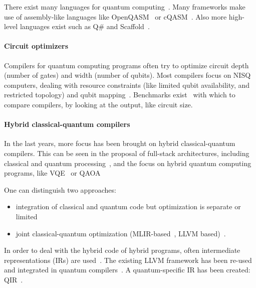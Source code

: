 There exist many languages for quantum computing~\cite{chong_programming_2017, heim_quantum_2020}.
Many frameworks make use of assembly-like languages like OpenQASM~\cite{cross_open_2017} or cQASM~\cite{khammassi_cqasm_2018}.
Also more high-level languages exist such as Q\# and Scaffold~\cite{svore_q_2018, litteken_updated_2020, heim_quantum_2020}.

\paragraph{Circuit optimizers}
Compilers for quantum computing programs often try to optimize circuit depth (number of gates) and width (number of qubits).
Most compilers focus on \ac{NISQ} computers, dealing with resource constraints (like limited qubit availability, and restricted topology) \cite{chong_programming_2017, murali_full-stack_2019, bandic_full-stack_2022} and qubit mapping~\cite{li_tackling_2019, zhang_context-sensitive_2020, bandic_mapping_2023, nishio_extracting_2020}.
Benchmarks exist~\cite{li_qasmbench_2023, tomesh_supermarq_2022} with which to compare compilers, by looking at the output, like circuit size.

\paragraph{Hybrid classical-quantum compilers}
In the last years, more focus has been brought on hybrid classical-quantum compilers.
This can be seen in the proposal of full-stack architectures, including classical and quantum processing~\cite{murali_full-stack_2019, khammassi_openql_2021, mccaskey_xacc_2020}, and the focus on hybrid quantum computing programs, like \acf{VQE}~\cite{diadamo2021distributed, liu2022layer} or \acf{QAOA}~\cite{farhi2014quantum}

One can distinguish two approaches:
\begin{itemize}
\item integration of classical and quantum code but optimization is separate or limited~\cite{litteken_updated_2020, fux_quingo_2021, khalate_llvm-based_2022, younis_quantum_2022}
\item joint classical-quantum optimization (MLIR-based~\cite{lattner_mlir_2020}, LLVM based)~\cite{mccaskey_mlir_2021, ittah_enabling_2022, nguyen_retargetable_2022, peduri_qssa_2022}.
\end{itemize}

In order to deal with the hybrid code of hybrid programs, often intermediate representations (IRs) are used~\cite{nigam_compiler_2021, nishio_inquir_2023}.
The existing LLVM framework has been re-used and integrated in quantum compilers~\cite{murali_noise-adaptive_2019, murali_full-stack_2019, litteken_updated_2020}.
A quantum-specific IR has been created: QIR~\cite{haner_software_2018, geller_introducing_2020}.

